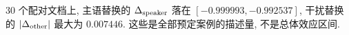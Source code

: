 30 个配对文档上, 主语替换的 $\Delta_{\rm speaker}$ 落在 $[-0.999993,-0.992537]$, 干扰替换的 $|\Delta_{\rm other}|$ 最大为 $0.007446$. 这些是全部预定案例的描述量, 不是总体效应区间.
